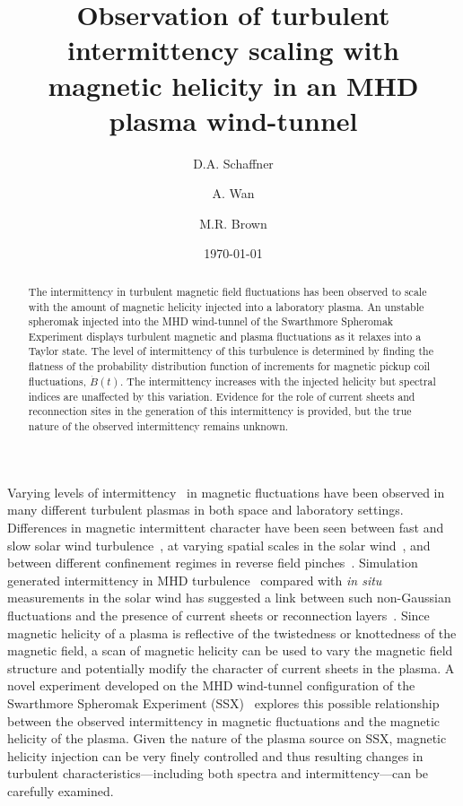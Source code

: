 \documentclass[aps,prl,amsmath,amssymb,reprint,superscriptaddress]{revtex4-1} %
\begin{document}
\title{Observation of turbulent intermittency scaling with magnetic helicity in an MHD plasma wind-tunnel}

\author{D.A. Schaffner}
\author{A. Wan}
\author{M.R. Brown}
\date{\today}
\begin{abstract}
The intermittency in turbulent magnetic field fluctuations has been observed to scale with the amount of magnetic helicity injected into a laboratory plasma. An unstable spheromak injected into the MHD wind-tunnel of the Swarthmore Spheromak Experiment displays turbulent magnetic and plasma fluctuations as it relaxes into a Taylor state. The level of intermittency of this turbulence is determined by finding the flatness of the probability distribution function of increments for magnetic pickup coil fluctuations, $\dot{B}(t)$. The intermittency increases with the injected helicity but spectral indices are unaffected by this variation. Evidence for the role of current sheets and reconnection sites in the generation of this intermittency is provided, but the true nature of the observed intermittency remains unknown.
\end{abstract}

\maketitle

Varying levels of intermittency~\cite{frisch95} in magnetic fluctuations have been observed in many different turbulent plasmas in both space and laboratory settings. Differences in magnetic intermittent character have been seen between fast and slow solar wind turbulence~\cite{sorrisovalvo99}, at varying spatial scales in the solar wind~\cite{wan12}, and between different confinement regimes in reverse field pinches~\cite{sorrisovalvo01,marrelli05}. Simulation generated intermittency in MHD turbulence~\cite{Greco08,Greco09,Wan09,Servidio11b} compared with {\it in situ} measurements in the solar wind has suggested a link between such non-Gaussian fluctuations and the presence of current sheets or reconnection layers~\cite{veltri99,carbone90}. Since magnetic helicity of a plasma is reflective of the twistedness or knottedness of the magnetic field, a scan of magnetic helicity can be used to vary the magnetic field structure and potentially modify the character of current sheets in the plasma. A novel experiment developed on the MHD wind-tunnel configuration of the Swarthmore Spheromak Experiment (SSX)~\cite{Gray13,schaffner14} explores this possible relationship between the observed intermittency in magnetic fluctuations and the magnetic helicity of the plasma. Given the nature of the plasma source on SSX, magnetic helicity injection can be very finely controlled and thus resulting changes in turbulent characteristics---including both spectra and intermittency---can be carefully examined.
\end{document}
